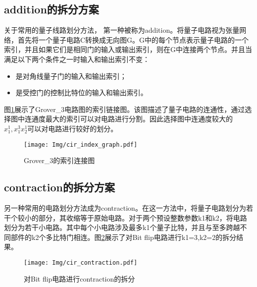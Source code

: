 \subsection*{addition的拆分方案}
\label{addition}关于常用的量子线路划分方法，
第一种被称为addition\citep{chen2018classical}。将量子电路视为张量网络，首先将一个量子电路C转换成无向图G。G中的每个节点表示量子电路的一个索引，并且如果它们是相同门的输入或输出索引，则在G中连接两个节点。并且当满足以下两个条件之一时输入和输出索引不变：
\begin{itemize}
	\item 是对角线量子门的输入和输出索引；
	\item 是受控门的控制比特位的输入和输出索引。
\end{itemize}
	
图\ref{fig:addition}展示了Grover\_3电路图的索引链接图。该图描述了量子电路的连通性，通过选择图中连通度最大的索引可以对电路进行分割。因此选择图中连通度较大的$x_1^1,x_1^3x_2^1$可以对电路进行较好的划分。
 
\begin{figure}[!htbp]
	\centering
	\texttt{[image: Img/cir\_index\_graph.pdf]}
	\caption{Grover\_3的索引连接图}
	\label{fig:addition}
\end{figure} 

\subsection*{contraction的拆分方案}
另一种常用的电路划分方法成为contraction。在这一方法中，将量子电路划分为若干个较小的部分，其收缩等于原始电路。对于两个预设整数参数k1和k2，将电路划分为若干小电路。其中每个小电路涉及最多k1个量子比特，并且与至多跨越不同部件的k2个多比特门相连。图\ref{fig:contraction}展示了对Bit flip电路进行k1=3,k2=2的拆分结果。
\begin{figure}[!htbp]
	\centering
	\texttt{[image: Img/cir\_contraction.pdf]}
	\caption{对Bit flip电路进行contraction的拆分}
	\label{fig:contraction}
\end{figure} 


